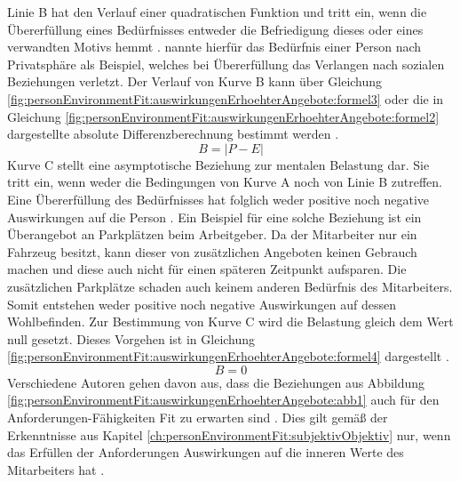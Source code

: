 Linie B hat den Verlauf einer quadratischen Funktion und tritt ein, wenn die Übererfüllung eines Bedürfnisses entweder die Befriedigung dieses oder eines verwandten Motivs hemmt \cite[S. 5]{caplan:1987}\cite[S. 21]{edwards:2008}. \textcite[S. 12]{harrison:1978} nannte hierfür das Bedürfnis einer Person nach Privatsphäre als Beispiel, welches bei Übererfüllung das Verlangen nach sozialen Beziehungen verletzt. Der Verlauf von Kurve B kann über Gleichung \ref{fig:personEnvironmentFit:auswirkungenErhoehterAngebote:formel3} oder die in Gleichung \ref{fig:personEnvironmentFit:auswirkungenErhoehterAngebote:formel2} dargestellte absolute Differenzberechnung bestimmt werden \cite[S. 2]{edwards:1993}.
\begin{equation}
	B = |P - E|
	\label{fig:personEnvironmentFit:auswirkungenErhoehterAngebote:formel2}
\end{equation}
Kurve C stellt eine asymptotische Beziehung zur mentalen Belastung dar. Sie tritt ein, wenn weder die Bedingungen von Kurve A noch von Linie B zutreffen. Eine Übererfüllung des Bedürfnisses hat folglich weder positive noch negative Auswirkungen auf die Person \cite[S. 30]{mechanismsOfJobStressAndStrain:1982}. Ein Beispiel für eine solche Beziehung ist ein Überangebot an Parkplätzen beim Arbeitgeber. Da der Mitarbeiter nur ein Fahrzeug besitzt, kann dieser von zusätzlichen Angeboten keinen Gebrauch machen und diese auch nicht für einen späteren Zeitpunkt aufsparen. Die zusätzlichen Parkplätze schaden auch keinem anderen Bedürfnis des Mitarbeiters. Somit entstehen weder positive noch negative Auswirkungen auf dessen Wohlbefinden. Zur Bestimmung von Kurve C wird die Belastung gleich dem Wert null gesetzt. Dieses Vorgehen ist in Gleichung \ref{fig:personEnvironmentFit:auswirkungenErhoehterAngebote:formel4} dargestellt \cite[S. 2]{edwards:1993}.
\begin{equation}
	B = 0
	\label{fig:personEnvironmentFit:auswirkungenErhoehterAngebote:formel4}
\end{equation}
Verschiedene Autoren gehen davon aus, dass die Beziehungen aus Abbildung \ref{fig:personEnvironmentFit:auswirkungenErhoehterAngebote:abb1} auch für den Anforderungen-Fähigkeiten Fit zu erwarten sind \cite[S. 31]{mechanismsOfJobStressAndStrain:1982}\cite[S. 12f.]{harrison:1978}. Dies gilt gemäß der Erkenntnisse aus Kapitel \ref{ch:personEnvironmentFit:subjektivObjektiv} nur, wenn das Erfüllen der Anforderungen Auswirkungen auf die inneren Werte des Mitarbeiters hat \cite[S. 12f.]{harrison:1978}.

